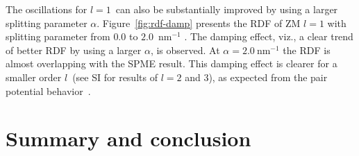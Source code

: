 \documentclass[a4paper,preprint,unsortedaddress,onecolumn,fleqn]{revtex4}
\begin{document}
The oscillations for $l=1$\ can also be substantially improved by using a
larger splitting parameter $\alpha $. Figure~\ref{fig:rdf-damp} presents the
RDF of ZM $l=1$ with splitting parameter from $0.0$ to $2.0$~$\text{nm}^{-1}$%
. The damping effect, viz., a clear trend of better RDF by using a larger $%
\alpha $, is observed. At $\alpha =2.0\ \text{nm}^{-1}$ the RDF is almost
overlapping with the SPME result. This damping effect is clearer for a
smaller order $l$\ (see SI for results of {$l=2$ and $3$}), as expected from
the pair potential behavior~\cite{fukuda2014zero}.






\section{Summary and conclusion}
\end{document}
